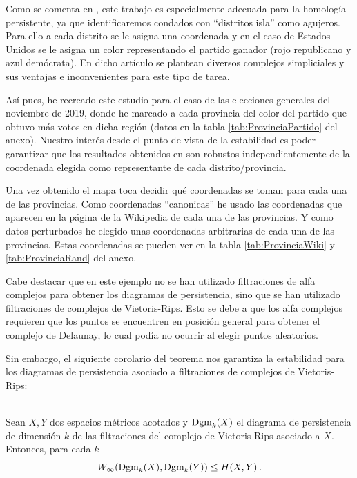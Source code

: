 Como se comenta en \cite{votosArticulo}, este trabajo es especialmente adecuada para la homología persistente, ya que identificaremos condados con ``distritos isla'' como agujeros. Para ello a cada distrito se le asigna una coordenada y en el caso de Estados Unidos se le asigna un color representando el partido ganador (rojo republicano y azul demócrata). En dicho artículo se plantean diversos complejos simpliciales y sus ventajas e inconvenientes para este tipo de tarea.

Así pues, he recreado este estudio para el caso de las elecciones generales del noviembre de 2019, donde he marcado a cada provincia del color del partido que obtuvo más votos en dicha región (datos en la tabla \ref{tab:ProvinciaPartido} del anexo). Nuestro interés desde el punto de vista de la estabilidad es poder garantizar que los resultados obtenidos en \cite{votosArticulo} son robustos independientemente de la coordenada elegida como representante de cada distrito/provincia.

Una vez obtenido el mapa toca decidir qué coordenadas se toman para cada una de las provincias. Como coordenadas ``canonicas'' he usado las coordenadas que aparecen en la página de la Wikipedia de cada una de las provincias. Y como datos perturbados he elegido unas coordenadas arbitrarias de cada una de las provincias. Estas coordenadas se pueden ver en la tabla \ref{tab:ProvinciaWiki} y \ref{tab:ProvinciaRand} del anexo.

Cabe destacar que en este ejemplo no se han utilizado filtraciones de alfa complejos para obtener los diagramas de persistencia, sino que se han utilizado filtraciones de complejos de Vietoris-Rips. Esto se debe a que los alfa complejos requieren que los puntos se encuentren en posición general para obtener el complejo de Delaunay, lo cual podía no ocurrir al elegir puntos aleatorios.

Sin embargo, el siguiente corolario del teorema \cite[Theorem~5.2]{persistenciaRips} nos garantiza la estabilidad para los diagramas de persistencia asociado a filtraciones de complejos de Vietoris-Rips:

\begin{corollary}
$ $\\
Sean $X, Y$ dos espacios métricos acotados y $\text{\rm Dgm}_k(X)$ el diagrama de persistencia de dimensión $k$ de las filtraciones del complejo de Vietoris-Rips asociado a $X$. Entonces, para cada $k$
\[
W_\infty(\text{\rm Dgm}_k(X), \text{\rm Dgm}_k(Y)) \leq H(X, Y)\,.
\]
\end{corollary}

